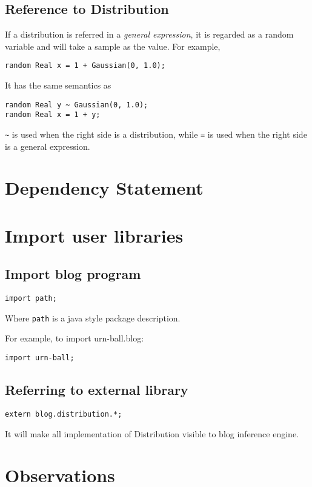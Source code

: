 \documentclass[12pt]{article}
\begin{document}
\subsection{Reference to Distribution}
If a distribution is referred in a \emph{general expression}, it is regarded as a random variable and will take a sample as the value.
For example, 
\begin{verbatim}
random Real x = 1 + Gaussian(0, 1.0);
\end{verbatim}
It has the same semantics as
\begin{verbatim}
random Real y ~ Gaussian(0, 1.0);
random Real x = 1 + y;
\end{verbatim}
\texttt{\~{}} is used when the right side is a distribution, while \texttt{=} is used when the right side is a general expression. 

\section{Dependency Statement}


\section{Import user libraries}
\subsection{Import blog program}
\begin{verbatim}
import path;
\end{verbatim}
Where \texttt{path} is a java style package description.

For example, to import urn-ball.blog:
\begin{verbatim}
import urn-ball;
\end{verbatim}

\subsection{Referring to external library}
\begin{verbatim}
extern blog.distribution.*;
\end{verbatim}
It will make all implementation of Distribution visible to blog inference engine.

\section{Observations}
\end{document}
